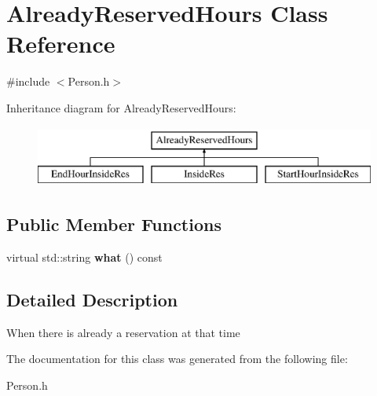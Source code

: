 \hypertarget{class_already_reserved_hours}{}\section{Already\+Reserved\+Hours Class Reference}
\label{class_already_reserved_hours}


{\ttfamily \#include $<$Person.\+h$>$}

Inheritance diagram for Already\+Reserved\+Hours\+:\begin{figure}[H]
\begin{center}
\leavevmode
\includegraphics[height=2.000000cm]{class_already_reserved_hours}
\end{center}
\end{figure}
\subsection*{Public Member Functions}
\begin{DoxyCompactItemize}
\item 
\mbox{\label{class_already_reserved_hours_a69081ef7e75aa68b9aa5c75d02fe2194}} 
virtual std\+::string {\bfseries what} () const
\end{DoxyCompactItemize}


\subsection{Detailed Description}
When there is already a reservation at that time 

The documentation for this class was generated from the following file\+:\begin{DoxyCompactItemize}
\item 
Person.\+h\end{DoxyCompactItemize}
